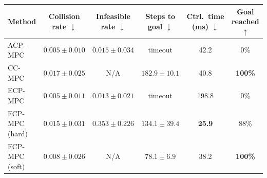 \begin{tabular}{lccccc}
\hline
Method &
Collision rate $\downarrow$ &
Infeasible rate $\downarrow$ &
Steps to goal $\downarrow$ &
Ctrl.\ time (ms) $\downarrow$ &
Goal reached $\uparrow$ \\
\hline
ACP-MPC~\cite{dixit2023adaptive}
& $\mathbf{0.005}\pm0.010$
& $0.015\pm0.034$
& timeout
& 42.2
& 0\% \\
CC-MPC~\cite{lekeufack2024decision}
& $0.017\pm0.025$
& N/A
& $182.9\pm10.1$
& 40.8
& \textbf{100\%} \\
ECP-MPC~\cite{shin2025egocentric}
& $\mathbf{0.005}\pm0.011$
& $\mathbf{0.013}\pm0.021$
& timeout
& 198.8
& 0\% \\
FCP-MPC (hard)
& $0.015\pm0.031$
& $0.353\pm0.226$
& $134.1\pm39.4$
& \textbf{25.9}
& 88\% \\
FCP-MPC (soft)
& $0.008\pm0.026$
& N/A
& $\mathbf{78.1}\pm6.9$
& 38.2
& \textbf{100\%} \\
\hline
\end{tabular}
